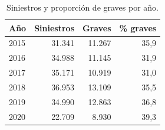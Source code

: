 \begin{table}[h]\centering\small
\caption{Siniestros y proporción de graves por año.}\label{tab:anio}
\begin{tabular}{lrrr}
\toprule
Año & Siniestros & Graves & \% graves \\
\midrule
2015 & 31.341 & 11.267 & 35,9 \\
2016 & 34.988 & 11.145 & 31,9 \\
2017 & 35.171 & 10.919 & 31,0 \\
2018 & 36.953 & 13.109 & 35,5 \\
2019 & 34.990 & 12.863 & 36,8 \\
2020 & 22.709 & 8.930 & 39,3 \\
\bottomrule
\end{tabular}
\end{table}